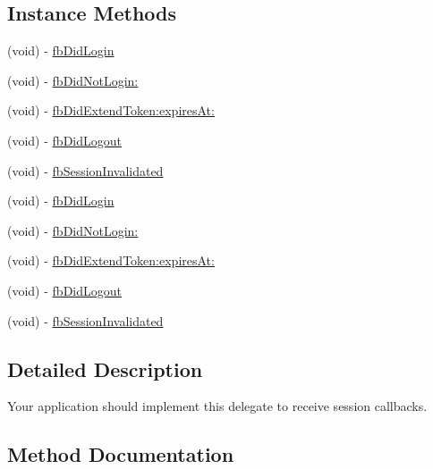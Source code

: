 \subsection*{Instance Methods}
\begin{DoxyCompactItemize}
\item 
(void) -\/ \hyperlink{protocolFBSessionDelegate_01-p_a18bb57139baaf9fe0814a573af4b7a98}{fb\+Did\+Login}
\item 
(void) -\/ \hyperlink{protocolFBSessionDelegate_01-p_a9a99db70fc8bf01d00bfe78525c343ac}{fb\+Did\+Not\+Login\+:}
\item 
(void) -\/ \hyperlink{protocolFBSessionDelegate_01-p_a9b11d87747c5e472cf95c58d45a85f9c}{fb\+Did\+Extend\+Token\+:expires\+At\+:}
\item 
(void) -\/ \hyperlink{protocolFBSessionDelegate_01-p_ae5b4b19d44526358ac0f55b7f9982d77}{fb\+Did\+Logout}
\item 
(void) -\/ \hyperlink{protocolFBSessionDelegate_01-p_a7267d87ae3fb160c0ac22d69781e8c42}{fb\+Session\+Invalidated}
\item 
(void) -\/ \hyperlink{protocolFBSessionDelegate_01-p_a18bb57139baaf9fe0814a573af4b7a98}{fb\+Did\+Login}
\item 
(void) -\/ \hyperlink{protocolFBSessionDelegate_01-p_a9a99db70fc8bf01d00bfe78525c343ac}{fb\+Did\+Not\+Login\+:}
\item 
(void) -\/ \hyperlink{protocolFBSessionDelegate_01-p_a9b11d87747c5e472cf95c58d45a85f9c}{fb\+Did\+Extend\+Token\+:expires\+At\+:}
\item 
(void) -\/ \hyperlink{protocolFBSessionDelegate_01-p_ae5b4b19d44526358ac0f55b7f9982d77}{fb\+Did\+Logout}
\item 
(void) -\/ \hyperlink{protocolFBSessionDelegate_01-p_a7267d87ae3fb160c0ac22d69781e8c42}{fb\+Session\+Invalidated}
\end{DoxyCompactItemize}


\subsection{Detailed Description}
Your application should implement this delegate to receive session callbacks. 

\subsection{Method Documentation}
\mbox{\label{protocolFBSessionDelegate_01-p_a9b11d87747c5e472cf95c58d45a85f9c}} 
